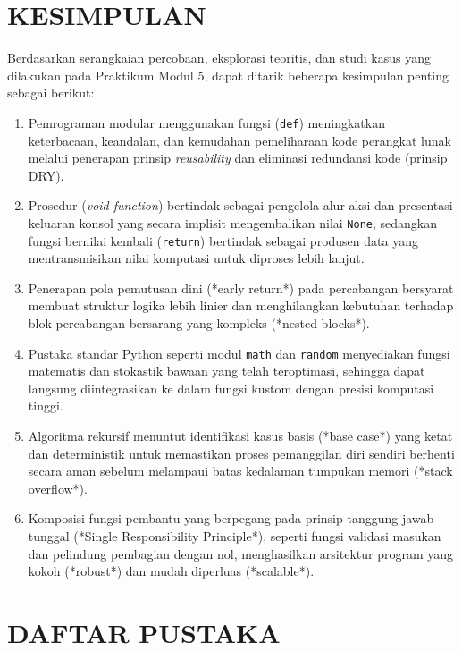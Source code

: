 \documentclass[12pt,a4paper]{article}
\begin{document}
\section{KESIMPULAN}
Berdasarkan serangkaian percobaan, eksplorasi teoritis, dan studi kasus yang dilakukan pada Praktikum Modul 5, dapat ditarik beberapa kesimpulan penting sebagai berikut:
\begin{enumerate}
    \item Pemrograman modular menggunakan fungsi (\texttt{def}) meningkatkan keterbacaan, keandalan, dan kemudahan pemeliharaan kode perangkat lunak melalui penerapan prinsip \textit{reusability} dan eliminasi redundansi kode (prinsip DRY).
    \item Prosedur (\textit{void function}) bertindak sebagai pengelola alur aksi dan presentasi keluaran konsol yang secara implisit mengembalikan nilai \texttt{None}, sedangkan fungsi bernilai kembali (\texttt{return}) bertindak sebagai produsen data yang mentransmisikan nilai komputasi untuk diproses lebih lanjut.
    \item Penerapan pola pemutusan dini (*early return*) pada percabangan bersyarat membuat struktur logika lebih linier dan menghilangkan kebutuhan terhadap blok percabangan bersarang yang kompleks (*nested blocks*).
    \item Pustaka standar Python seperti modul \texttt{math} dan \texttt{random} menyediakan fungsi matematis dan stokastik bawaan yang telah teroptimasi, sehingga dapat langsung diintegrasikan ke dalam fungsi kustom dengan presisi komputasi tinggi.
    \item Algoritma rekursif menuntut identifikasi kasus basis (*base case*) yang ketat dan deterministik untuk memastikan proses pemanggilan diri sendiri berhenti secara aman sebelum melampaui batas kedalaman tumpukan memori (*stack overflow*).
    \item Komposisi fungsi pembantu yang berpegang pada prinsip tanggung jawab tunggal (*Single Responsibility Principle*), seperti fungsi validasi masukan dan pelindung pembagian dengan nol, menghasilkan arsitektur program yang kokoh (*robust*) dan mudah diperluas (*scalable*).
\end{enumerate}

\section{DAFTAR PUSTAKA}
\end{document}
